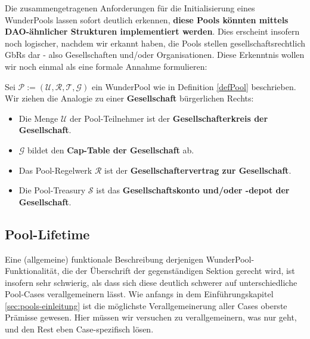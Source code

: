 \vspace{0.3cm}

Die zusammengetragenen Anforderungen für die Initialisierung eines WunderPools lassen sofort deutlich erkennen, \textbf{diese Pools könnten mittels DAO-ähnlicher Strukturen implementiert werden}. Dies erscheint insofern noch logischer, nachdem wir erkannt haben, die Pools stellen gesellschaftsrechtlich GbRs dar - also Gesellschaften und/oder Organisationen. Diese Erkenntnis wollen wir noch einmal als eine formale Annahme formulieren: 

\vspace{0.2cm}

\begin{Assumption}
\label{assumptionGbR} 

Sei $\mathcal{P} := \left( \mathcal{U}, \mathcal{R}, \mathcal{T}, \mathcal{G} \right)$ ein WunderPool wie in Definition \ref{defPool} beschrieben. Wir ziehen die Analogie zu einer \textbf{Gesellschaft} bürgerlichen Rechts:

\begin{itemize}
	\item Die Menge $\mathcal{U}$ der Pool-Teilnehmer ist der \textbf{Gesellschafterkreis der Gesellschaft}.
	\item $\mathcal{G}$ bildet den \textbf{Cap-Table der Gesellschaft} ab.
	\item Das Pool-Regelwerk $\mathcal{R}$ ist der \textbf{Gesellschaftervertrag zur Gesellschaft}.
	\item Die Pool-Treasury $\mathcal{S}$ ist das \textbf{Gesellschaftskonto und/oder -depot der Gesellschaft}.
\end{itemize}

\end{Assumption}
 
\vspace{0.5cm}

\subsection{Pool-Lifetime}

\vspace{0.3cm}

Eine (allgemeine) funktionale Beschreibung derjenigen WunderPool-Funktionalität, die der Überschrift der gegenständigen Sektion gerecht wird, ist insofern sehr schwierig, als dass sich diese deutlich schwerer auf unterschiedliche Pool-Cases verallgemeinern lässt. Wie anfangs in dem Einführungskapitel \ref{sec:pools-einleitung} ist die möglichste Verallgemeinerung aller Cases oberste Prämisse gewesen. Hier müssen wir versuchen zu verallgemeinern, was nur geht, und den Rest eben Case-spezifisch lösen. 

